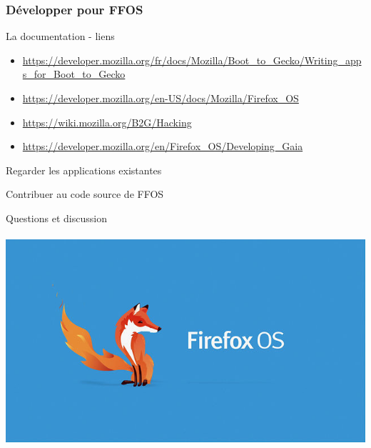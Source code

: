 \documentclass{beamer}
\begin{document}
\begin{frame}
\frametitle{Développer pour FFOS}

\begin{block}{La documentation - liens}
\begin{itemize}
\item \url{https://developer.mozilla.org/fr/docs/Mozilla/Boot_to_Gecko/Writing_apps_for_Boot_to_Gecko}
\item \url{https://developer.mozilla.org/en-US/docs/Mozilla/Firefox_OS}
\item \url{https://wiki.mozilla.org/B2G/Hacking}
\item \url{https://developer.mozilla.org/en/Firefox_OS/Developing_Gaia}
\end{itemize}
\end{block}

\begin{block}{Regarder les applications existantes}
\end{block}

\begin{block}{Contribuer au code source de FFOS}
\end{block}
\end{frame}

\begin{frame}
\begin{center}
\Huge{Questions et discussion}
\\~\\
\includegraphics[scale=0.3]{./images/firefox-os.jpg}
\end{center}
\end{frame}
\end{document}
